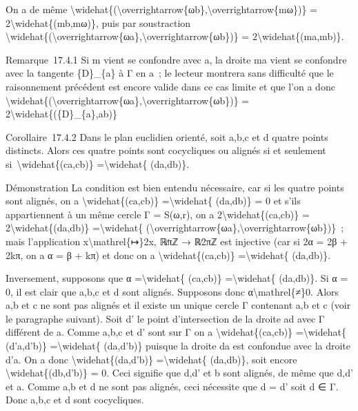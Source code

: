 \documentclass[]{article}
\begin{document}
On a de même
\textbackslash{}widehat\{(\textbackslash{}overrightarrow\{ωb\},\textbackslash{}overrightarrow\{mω\})\}
= 2\textbackslash{}widehat\{(mb,mω)\}, puis par soustraction
\textbackslash{}widehat\{(\textbackslash{}overrightarrow\{ωa\},\textbackslash{}overrightarrow\{ωb\})\}
= 2\textbackslash{}widehat\{(ma,mb)\}.

Remarque~17.4.1 Si m vient se confondre avec a, la droite ma vient se
confondre avec la tangente \{D\}\_\{a\} à Γ en a~; le lecteur montrera
sans difficulté que le raisonnement précédent est encore valide dans ce
cas limite et que l'on a donc
\textbackslash{}widehat\{(\textbackslash{}overrightarrow\{ωa\},\textbackslash{}overrightarrow\{ωb\})\}
= 2\textbackslash{}widehat\{(\{D\}\_\{a\},ab)\}

Corollaire~17.4.2 Dans le plan euclidien orienté, soit a,b,c et d quatre
points distincts. Alors ces quatre points sont cocycliques ou alignés si
et seulement si~\textbackslash{}widehat\{(ca,cb)\}
=\textbackslash{}widehat\{ (da,db)\}.

Démonstration La condition est bien entendu nécessaire, car si les
quatre points sont alignés, on a \textbackslash{}widehat\{(ca,cb)\}
=\textbackslash{}widehat\{ (da,db)\} = 0 et s'ils appartiennent à un
même cercle Γ = S(ω,r), on a 2\textbackslash{}widehat\{(ca,cb)\} =
2\textbackslash{}widehat\{(da,db)\} =\textbackslash{}widehat\{
(\textbackslash{}overrightarrow\{ωa\},\textbackslash{}overrightarrow\{ωb\})\}~;
mais l'application x\textbackslash{}mathrel\{↦\}2x, ℝ∕πℤ → ℝ∕2πℤ est
injective (car si 2α = 2β + 2kπ, on a α = β + kπ) et donc on a
\textbackslash{}widehat\{(ca,cb)\} =\textbackslash{}widehat\{ (da,db)\}.

Inversement, supposons que α =\textbackslash{}widehat\{ (ca,cb)\}
=\textbackslash{}widehat\{ (da,db)\}. Si α = 0, il est clair que a,b,c
et d sont alignés. Supposons donc α\textbackslash{}mathrel\{≠\}0. Alors
a,b et c ne sont pas alignés et il existe un unique cercle Γ contenant
a,b et c (voir le paragraphe suivant). Soit d' le point d'intersection
de la droite ad avec Γ différent de a. Comme a,b,c et d' sont sur Γ on a
\textbackslash{}widehat\{(ca,cb)\} =\textbackslash{}widehat\{
(d'a,d'b)\} =\textbackslash{}widehat\{ (da,d'b)\} puisque la droite da
est confondue avec la droite d'a. On a donc
\textbackslash{}widehat\{(da,d'b)\} =\textbackslash{}widehat\{
(da,db)\}, soit encore \textbackslash{}widehat\{(db,d'b)\} = 0. Ceci
signifie que d,d' et b sont alignés, de même que d,d' et a. Comme a,b et
d ne sont pas alignés, ceci nécessite que d = d' soit d ∈ Γ. Donc a,b,c
et d sont cocycliques.
\end{document}

